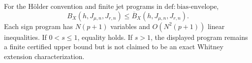 For the H\"older convention and finite jet programs in \(\mathrm{def:bias\text{-}envelope}\),
\[
B_X(h,J_{\mu,n},J_{r,n})\le\overline B_X(h,J_{\mu,n},J_{r,n}).
\]
Each sign program has \(N(p+1)\) variables and \(O(N^2(p+1))\) linear inequalities. If \(0<s\le1\), equality holds. If \(s>1\), the displayed program remains a finite certified upper bound but is not claimed to be an exact Whitney extension characterization.